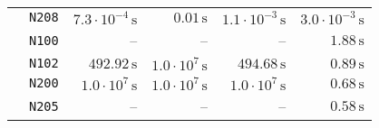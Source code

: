\begin{tabular}{cc|rrrr}
 & \texttt{\footnotesize                 N208} & $ 7.3\cdot 10^{-4}\,\text{s}$ & $             0.01\,\text{s}$ & $ 1.1\cdot 10^{-3}\,\text{s}$ & $ 3.0\cdot 10^{-3}\,\text{s}$\\
 & \texttt{\footnotesize                 N100} &                              -- &                              -- &                              -- & $             1.88\,\text{s}$\\
 & \texttt{\footnotesize                 N102} & $           492.92\,\text{s}$ & $  1.0\cdot 10^{7}\,\text{s}$ & $           494.68\,\text{s}$ & $             0.89\,\text{s}$\\
 & \texttt{\footnotesize                 N200} & $  1.0\cdot 10^{7}\,\text{s}$ & $  1.0\cdot 10^{7}\,\text{s}$ & $  1.0\cdot 10^{7}\,\text{s}$ & $             0.68\,\text{s}$\\
 & \texttt{\footnotesize                 N205} &                              -- &                              -- &                              -- & $             0.58\,\text{s}$\\
\end{tabular}
